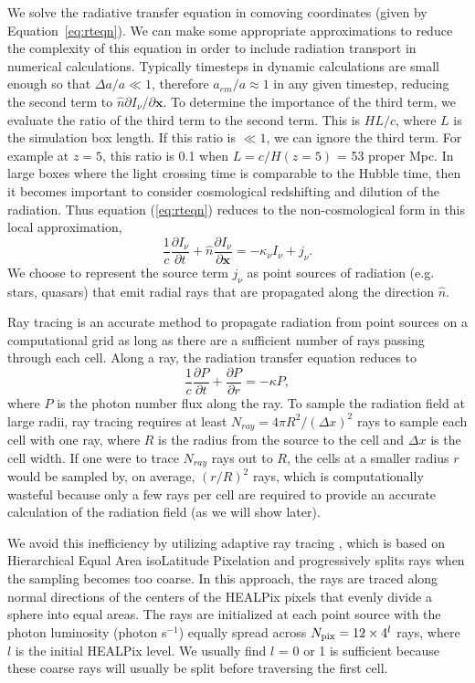 We solve the radiative transfer equation in comoving coordinates (given by Equation~\ref{eq:rteqn}).
We can make some appropriate approximations to reduce the complexity
of this equation in order to include radiation transport
in numerical calculations.  Typically timesteps in dynamic
calculations are small enough so that $\Delta a/a \ll 1$, therefore
$a_{em}/a \approx 1$ in any given timestep, reducing the second term to
$\hat{n} \partial I_\nu/\partial \mathbf{x}$.  To determine the
importance of the third term, we evaluate the ratio of the third term
to the second term.  This is $HL/c$, where $L$ is the simulation box
length.  If this ratio is $\ll 1$, we can ignore the third term.  For
example at $z=5$, this ratio is 0.1 when $L = c/H(z=5)$ = 53 proper
Mpc.  In large boxes where the light crossing time is comparable to
the Hubble time, then it becomes important to consider cosmological
redshifting and dilution of the radiation.  Thus equation
(\ref{eq:rteqn}) reduces to the non-cosmological form in this local
approximation,
%
\begin{equation}
  \frac{1}{c} \frac{\partial I_\nu}{\partial t} + 
  \hat{n} \frac{\partial I_\nu}{\partial \mathbf{x}} =
  -\kappa_\nu I_\nu + j_\nu .
\end{equation}
%
We choose to represent the source term $j_\nu$ as point sources of
radiation (e.g. stars, quasars) that emit radial rays that are
propagated along the direction $\hat{n}$.

Ray tracing is an accurate method to propagate radiation from point
sources on a computational grid as long as there are a sufficient
number of rays passing through each cell.  Along a ray, the radiation
transfer equation reduces to
%
\begin{equation}
\label{eqn:rtray}
\frac{1}{c} \frac{\partial P}{\partial t} + \frac{\partial P}{\partial
  r} = -\kappa P,
\end{equation}
where $P$ is the photon number flux along the ray.  To sample the
radiation field at large radii, ray tracing requires at least $N_{ray}
= 4\pi R^2 / (\Delta x)^2$ rays to sample each cell with one ray,
where $R$ is the radius from the source to the cell and $\Delta x$ is
the cell width.  If one were to trace $N_{ray}$ rays out to $R$, the
cells at a smaller radius $r$ would be sampled by, on average,
$(r/R)^2$ rays, which is computationally wasteful because only a few
rays per cell  are required to provide an accurate calculation
of the radiation field (as we will show later).

We avoid this inefficiency by utilizing adaptive ray tracing
\citep{Abel02_RT}, which is based on Hierarchical Equal Area isoLatitude
Pixelation \citep[HEALPix;][]{HEALPix} and progressively splits rays when the sampling
becomes too coarse.  In this approach, the rays are
traced along normal directions of the centers of the HEALPix pixels that 
evenly divide a sphere into equal areas.  The rays are initialized at
each point source with the photon luminosity (photon s$^{-1}$) equally
spread across $N_{\rm pix} = 12 \times 4^l$ rays, where $l$ is the
initial HEALPix level.  We usually find $l$ = 0 or 1 is sufficient
because these coarse rays will usually be split before traversing
the first cell.

